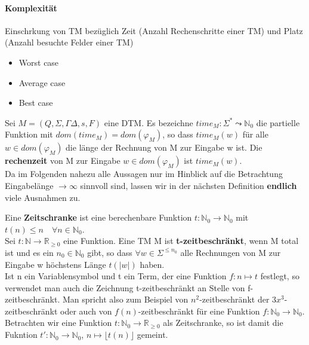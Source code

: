 \paragraph*{Komplexität} 
    Einschrkung von TM bezüglich Zeit (Anzahl Rechenschritte einer TM) und Platz (Anzahl besuchte Felder einer TM)
    \begin{itemize}
        \item Worst case
        \item Average case
        \item Best case
    \end{itemize}

    Sei \(M = (Q, \Sigma, \Gamma \Delta, s, F)\) eine DTM. Es bezeichne \(time_M:\Sigma^* \leadsto \mathbb{N}_0\) die partielle Funktion mit \(dom(time_M) = dom (\varphi_M)\), so dass \(time_M(w)\) für alle \(w \in dom (\varphi_M)\) die länge der Rechnung von M zur Eingabe w ist. Die \textbf{rechenzeit} von M zur Eingabe \(w \in dom (\varphi_M)\) ist \(time_M(w)\). \\
    Da im Folgenden nahezu alle Aussagen nur im Hinblick auf die Betrachtung Eingabelänge \(\to \infty\) sinnvoll sind, lassen wir in der nächsten Definition \textbf{endlich} viele Ausnahmen zu.

    Eine \textbf{Zeitschranke} ist eine berechenbare Funktion \(t: \mathbb{N}_0 \to \mathbb{N}_0\) mit \(t(n)\leq n \quad \forall n \in \mathbb{N}_0\).\\ Sei \(t: \mathbb{N}\to \mathbb{R}_{\geq 0}\) eine Funktion. Eine TM M ist \textbf{t-zeitbeschränkt}, wenn M total ist und es ein \(n_0 \in \mathbb{N}_0\) gibt, so dass \(\forall w \in \Sigma^{\leq n_0}\) alle Rechnungen von M zur Eingabe w höchstens Länge \(t(|w|)\) haben.
    \vspace{0.5cm}
    \\
    Ist n ein Variablensymbol und t ein Term, der eine Funktion \(f: n \mapsto t\) festlegt, so verwendet man auch die Zeichnung t-zeitbeschränkt an Stelle von f-zeitbeschränkt. Man spricht also zum Beispiel von \(n^2\)-zeitbeschränkt der \(3x^3\)-zeitbeschränkt oder auch von \(f(n)\)-zeitbeschränkt für eine Funktion \(f: \mathbb{N}_0 \to \mathbb{N}_0\). Betrachten wir eine Funktion \(t: \mathbb{N}_0 \to \mathbb{R}_{\geq 0}\) als Zeitschranke, so ist damit die Fukntion \(t': \mathbb{N}_0 \to \mathbb{N}_0\), \(n \mapsto \lfloor t(n)\rfloor\) gemeint.

